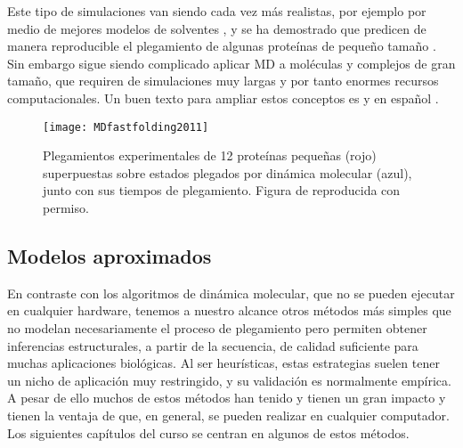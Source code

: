 Este tipo de simulaciones van siendo cada vez m\'{a}s realistas, por ejemplo por medio de mejores modelos de solventes \citep{Lee2013},
y se ha demostrado que predicen de manera reproducible el plegamiento de algunas prote\'{i}nas de peque\~{n}o tama\~{n}o \citep{Lindorff-Larsen2011}.
Sin embargo sigue siendo complicado aplicar MD a mol\'{e}culas y complejos de gran tama\~{n}o, 
que requiren de simulaciones muy largas y por tanto enormes recursos computacionales.
Un buen texto para ampliar estos conceptos es \citet{Leach2001} y en espa\~{n}ol \citet{bueren_calabuig_juan_a_2014_1066360}.

\begin{figure}
\begin{center} 
\texttt{[image: MDfastfolding2011]}
\caption%
{
Plegamientos experimentales de 12 prote\'{i}nas peque\~{n}as (rojo) superpuestas sobre estados plegados por din\'{a}mica molecular (azul),
junto con sus tiempos de plegamiento.
Figura de \cite{Lindorff-Larsen2011} reproducida con permiso.
}
\label{fig:MDfastfolding}
\end{center}
\end{figure}



\subsection{Modelos aproximados}

En contraste con los algoritmos de din\'{a}mica molecular, que no se pueden ejecutar en cualquier hardware,
tenemos a nuestro alcance otros m\'{e}todos m\'{a}s simples  
que no modelan necesariamente el proceso de plegamiento pero permiten obtener inferencias estructurales, 
a partir de la secuencia, de calidad suficiente para muchas aplicaciones biol\'{o}gicas. 
Al ser heur\'{i}sticas, estas estrategias suelen tener un nicho
de aplicaci\'{o}n muy restringido, y su validaci\'{o}n es normalmente emp\'{i}rica. 
A pesar de ello muchos de estos m\'{e}todos han tenido y tienen un gran impacto y 
tienen la ventaja de que, en general, se pueden realizar en cualquier computador. 
Los siguientes cap\'{i}tulos del curso se centran en algunos de estos m\'{e}todos.

